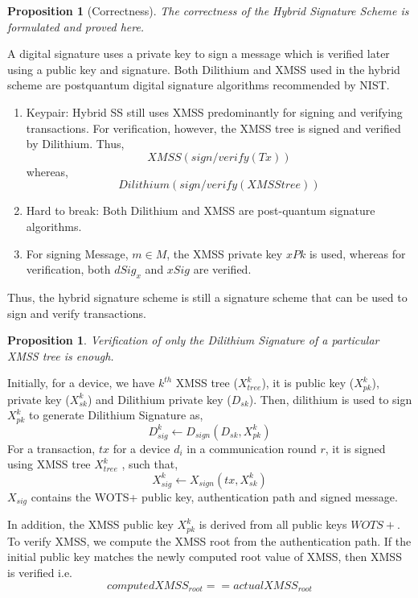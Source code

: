 \documentclass[5p,times]{elsarticle}
\newtheorem{prop}[thm]{Proposition}
\theoremstyle{definition}
\theoremstyle{remark}
\numberwithin{equation}{section}
\begin{document}
\begin{prop}[Correctness]
The correctness of the Hybrid Signature Scheme is formulated and proved here.
\end{prop}
A digital signature uses a private key to sign a message which is verified later using a public key and signature.
Both Dilithium and XMSS used in the hybrid scheme are postquantum digital signature algorithms recommended by NIST.
\begin{enumerate}
    \item Keypair: Hybrid SS still uses XMSS predominantly for signing and verifying transactions. 
    For verification, however, the XMSS tree is signed and verified by Dilithium. 
    Thus, 
    $$XMSS(sign/verify(Tx))$$ whereas, 
    $$Dilithium(sign/verify(XMSStree))$$
    \item Hard to break: Both Dilithium and XMSS are post-quantum signature algorithms.
    \item For signing Message, $m\in M$, the XMSS private key $xPk$ is used, whereas for verification, both $dSig_x$ and $xSig$ are verified.
\end{enumerate}
Thus, the hybrid signature scheme is still a signature scheme that can be
used to sign and verify transactions.

\begin{prop} \label{prop:dilithium_enough}
Verification of only the Dilithium Signature of a particular XMSS tree is enough.
\end{prop}
Initially, for a device, we have $k^{th}$ XMSS tree ($X_{tree}^k$), it is public key ($X_{pk}^k$), private key ($X_{sk}^k$) and Dilithium private key ($D_{sk}$).
Then, dilithium is used to sign $X_{pk}^k$ to generate Dilithium Signature as, 
$$D_{sig}^k \leftarrow D_{sign}(D_{sk}, X_{pk}^{k})$$
For a transaction, $tx$ for a device $d_i$ in a communication round $r$, 
it is signed using XMSS tree $X_{tree}^k$ , such that, 
$$ X_{sig}^k \leftarrow X_{sign}(tx, X_{sk}^k)$$
$X_{sig}$ contains the WOTS+ public key, authentication path and signed message.

In addition, the XMSS public key $X_{pk}^k$ is derived from all public keys $WOTS+$.
To verify XMSS, we compute the XMSS root from the authentication path. 
If the initial public key matches the newly computed root value of XMSS, then XMSS is verified i.e.
$$computedXMSS_{root} == actualXMSS_{root}$$
\end{document}
